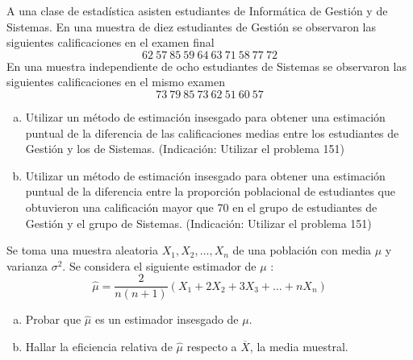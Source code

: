 \documentclass[12pt]{article}\usepackage[]{graphicx}\usepackage[]{color}
\begin{document}
\begin{prob}
A una clase de estadística asisten estudiantes de Informática de Gestión y de
Sistemas. En una muestra de
diez estudiantes de Gestión  se observaron las
siguientes calificaciones en el examen final
$$62 \ 57 \ 85 \ 59\ 64\ 63\ 71\ 58\ 77\ 72$$
En una muestra independiente de ocho estudiantes de Sistemas se
observaron las siguientes calificaciones en el mismo examen
$$73 \ 79 \ 85 \ 73\ 62\ 51\ 60\ 57$$
\begin{enumerate}[a)]
\item Utilizar un método de estimación insesgado para
obtener una estimación puntual de la diferencia de las
calificaciones medias entre los estudiantes de Gestión y
los de Sistemas. (Indicación: Utilizar el problema 151)
\item Utilizar un método de estimación insesgado para obtener una
estimación puntual de la diferencia entre la proporción poblacional de
estudiantes que obtuvieron una calificación  mayor que 70 en el
grupo de estudiantes de Gestión y el grupo de Sistemas.
(Indicación: Utilizar el problema 151)
\end{enumerate}
\end{prob}
\begin{prob}
Se toma una muestra aleatoria $X_{1},X_{2},\ldots,X_{n}$  de una población con media $\mu$
y varianza $\sigma^2$. Se considera el siguiente estimador de $\mu$ :
$$\hat{\mu}=\frac{2}{n(n+1)}(X_{1}+2X_{2}+3X_{3}+\ldots+nX_{n})$$
\begin{enumerate}[a)]
\item Probar que $\hat{\mu}$ es un estimador insesgado de $\mu$.
\item Hallar la eficiencia relativa de $\hat{\mu}$  respecto a
$\overline{X}$, la media muestral.
\end{enumerate}
\end{prob}
\end{document}

